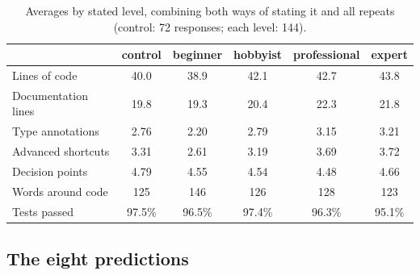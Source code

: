 \documentclass[11pt,a4paper]{article}
\begin{document}
\begin{table}[H]
\centering\small
\caption{Averages by stated level, combining both ways of stating it and all repeats (control: 72 responses; each level: 144).}
\begin{tabular}{lccccc}
\toprule
 & control & beginner & hobbyist & professional & expert \\
\midrule
Lines of code & 40.0 & 38.9 & 42.1 & 42.7 & 43.8 \\
Documentation lines & 19.8 & 19.3 & 20.4 & 22.3 & 21.8 \\
Type annotations & 2.76 & 2.20 & 2.79 & 3.15 & 3.21 \\
Advanced shortcuts & 3.31 & 2.61 & 3.19 & 3.69 & 3.72 \\
Decision points & 4.79 & 4.55 & 4.54 & 4.48 & 4.66 \\
Words around code & 125 & 146 & 126 & 128 & 123 \\
Tests passed & 97.5\% & 96.5\% & 97.4\% & 96.3\% & 95.1\% \\
\bottomrule
\end{tabular}
\end{table}

\subsection{The eight predictions}
\end{document}
